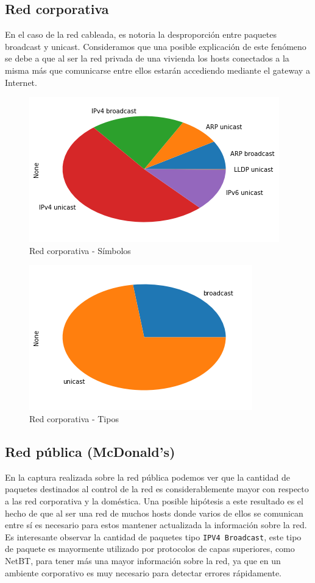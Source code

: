 \subsection{Red corporativa}

En el caso de la red cableada, es notoria la desproporción entre paquetes broadcast y unicast. Consideramos que una posible explicación de este fenómeno se debe a que al ser la red privada de una vivienda los hosts conectados a la misma más que comunicarse entre ellos estarán accediendo mediante el gateway a Internet.

\begin{figure}[H]
	\centering
	\includegraphics[width=.5\linewidth]{imagenes/despegar_torta_simbolos}
	\caption{Red corporativa - Símbolos}
\end{figure}

\begin{figure}[H]
	\centering
	\includegraphics[width=.5\linewidth]{imagenes/despegar_torta_tipos}
	\caption{Red corporativa - Tipos}
\end{figure}

\subsection{Red pública (McDonald's)}

En la captura realizada sobre la red pública podemos ver que la cantidad de paquetes destinados al control de la red es considerablemente mayor con respecto a las red corporativa y la doméstica. Una posible hipótesis a este resultado es el hecho de que al ser una red de muchos hosts donde varios de ellos se comunican entre sí es necesario para estos mantener actualizada la información sobre la red. Es interesante observar la cantidad de paquetes tipo \texttt{IPV4 Broadcast}, este tipo de paquete es mayormente utilizado por protocolos de capas superiores, como NetBT, para tener más una mayor información sobre la red, ya que en un ambiente corporativo es muy necesario para detectar errores rápidamente.


